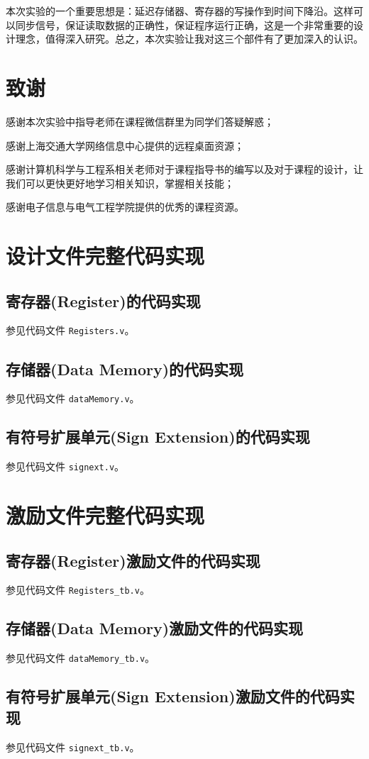 \documentclass{cumcm}
\numberwithin{equation}{section}
\numberwithin{equation}{subsection}
\begin{document}
本次实验的一个重要思想是：延迟存储器、寄存器的写操作到时间下降沿。这样可以同步信号，保证读取数据的正确性，保证程序运行正确，这是一个非常重要的设计理念，值得深入研究。总之，本次实验让我对这三个部件有了更加深入的认识。


\section{致谢}\label{section6}
感谢本次实验中指导老师在课程微信群里为同学们答疑解惑；

感谢上海交通大学网络信息中心提供的远程桌面资源；

感谢计算机科学与工程系相关老师对于课程指导书的编写以及对于课程的设计，让我们可以更快更好地学习相关知识，掌握相关技能；

感谢电子信息与电气工程学院提供的优秀的课程资源。
%
%

\clearpage
\begin{appendices}
\section{设计文件完整代码实现}\label{appsection1}
\subsection{寄存器(Register)的代码实现}\label{appsection1.1}
参见代码文件 \texttt{Registers.v}。
\subsection{存储器(Data Memory)的代码实现}\label{appsection1.2}
参见代码文件 \texttt{dataMemory.v}。
\subsection{有符号扩展单元(Sign Extension)的代码实现}\label{appsection1.3}
参见代码文件 \texttt{signext.v}。
\section{激励文件完整代码实现}\label{appsection2}
\subsection{寄存器(Register)激励文件的代码实现}\label{appsection2.1}
参见代码文件 \texttt{Registers\_tb.v}。
\subsection{存储器(Data Memory)激励文件的代码实现}\label{appsection2.2}
参见代码文件 \texttt{dataMemory\_tb.v}。
\subsection{有符号扩展单元(Sign Extension)激励文件的代码实现}\label{appsection2.3}
参见代码文件 \texttt{signext\_tb.v}。
\end{appendices}
\end{document}
